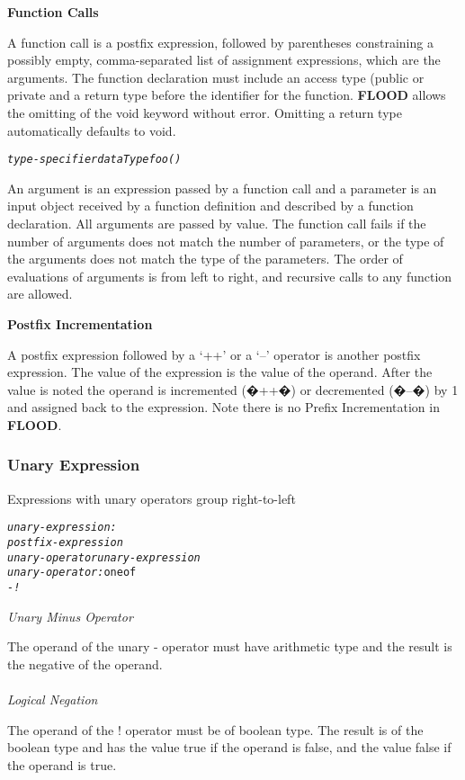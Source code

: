\documentclass[12pt]{report}
\begin{document}
\begin{doublespace}
\begin{flushleft}
\textbf{Function Calls}
\end{flushleft}

A function call is a postfix expression, followed by parentheses constraining a possibly empty, comma-separated list of assignment expressions, which are the arguments. The function declaration must include an access type (public or private and a return type before the identifier for the function. \textbf{FLOOD} allows the omitting of the void keyword without error. Omitting a return type automatically defaults to void.
\begin{alltt}
         \textit{type-specifier dataType foo()}
\end{alltt}

An argument is an expression passed by a function call and a parameter is an input object received by a function definition and described by a function declaration. All arguments are passed by value. The function call fails if the number of arguments does not match the number of parameters, or the type of the arguments does not match the type of the parameters. The order of evaluations of arguments is from left to right, and recursive calls to any function are allowed.
\begin{flushleft}
\textbf{Postfix Incrementation}
\end{flushleft}

A postfix expression followed by a `++' or a `--' operator is another postfix expression. The value of the expression is the value of the operand. After the value is noted the operand is incremented (�++�) or decremented (�--�) by 1 and assigned back to the expression. Note there is no Prefix Incrementation in \textbf{FLOOD}.
\end{doublespace}

\subsubsection{Unary Expression}

Expressions with unary operators group right-to-left
\begin{alltt}
         \textit{unary-expression:}
              \textit{postfix-expression}
              \textit{unary-operator unary-expression}
         \textit{unary-operator:} one of
              \textit{-}   \textit{!}
\end{alltt}
\begin{doublespace}
\textit{Unary Minus Operator}

The operand of the unary - operator must have arithmetic type and the result is the negative of the operand.\\
\\
\textit{Logical Negation}

The operand of the ! operator must be of boolean type. The result is of the boolean type and has the value true if the operand is false, and the value false if the operand is true.
\end{doublespace}
\end{document}

